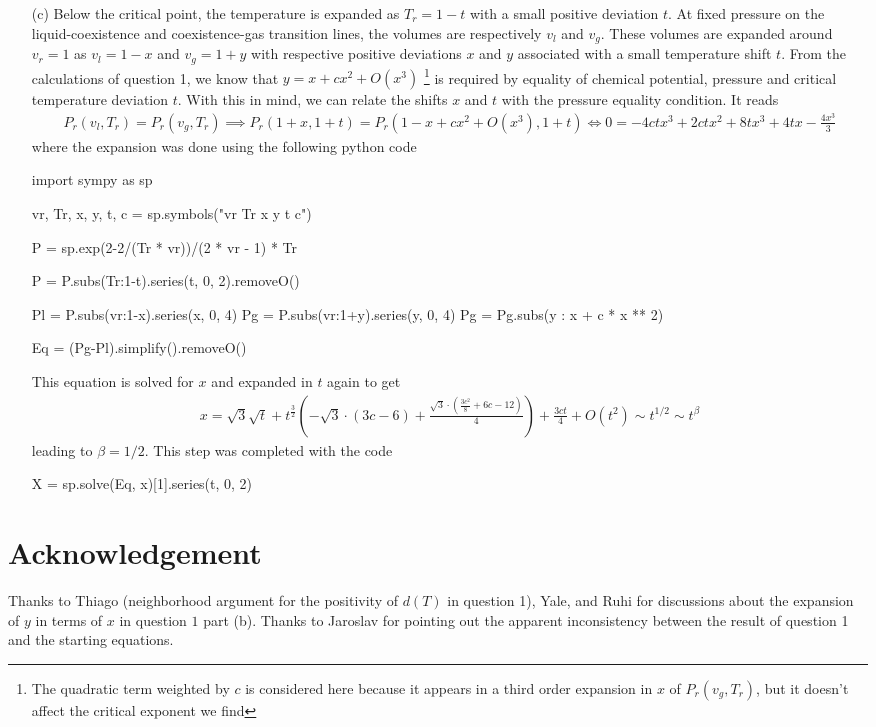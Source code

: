 \documentclass[10pt, a4paper]{article}
\begin{document}
{\begin{enumerate}
  \item[(c)] Below the critical point, the temperature is expanded as $T_r = 1 - t$ with a small positive deviation $t$. At fixed pressure on the liquid-coexistence and coexistence-gas transition lines, the volumes are respectively $v_l$ and $v_g$. These volumes are expanded around $v_r = 1$ as $v_l = 1 - x$ and $v_g = 1 + y$ with respective positive deviations $x$ and $y$ associated with a small temperature shift $t$. From the calculations of question 1, we know that $y = x + c x^2 + O(x^3)$ \footnote{The quadratic term weighted by $c$ is considered here because it appears in a third order expansion in $x$ of $P_r(v_g, T_r)$, but it doesn't affect the critical exponent we find} is required by equality of chemical potential, pressure and critical temperature deviation $t$. With this in mind, we can relate the shifts $x$ and $t$ with the pressure equality condition. It reads  
  \begin{align*}
    P_r(v_l, T_r) = P_r(v_g, T_r) \implies  P_r(1+x, 1+t) = P_r(1-x + cx^2 + O(x^3), 1+t)
    \iff 0 = - 4 c t x^{3} + 2 c t x^{2} + 8 t x^{3} + 4 t x - \frac{4 x^{3}}{3}
  \end{align*} 
where the expansion was done using the following python code
\begin{python}
import sympy as sp 

vr, Tr, x, y, t, c = sp.symbols("vr Tr x y t c")

P = sp.exp(2-2/(Tr * vr))/(2 * vr - 1) * Tr

P = P.subs({Tr:1-t}).series(t, 0, 2).removeO()

Pl = P.subs({vr:1-x}).series(x, 0, 4) 
Pg = P.subs({vr:1+y}).series(y, 0, 4) 
Pg = Pg.subs({y : x + c * x ** 2})

Eq = (Pg-Pl).simplify().removeO()
\end{python}
This equation is solved for $x$ and expanded in $t$ again to get 
\begin{align*}
  x = \sqrt{3} \sqrt{t} + t^{\frac{3}{2}} \left(- \sqrt{3} \cdot \left(3 c - 6\right) + \frac{\sqrt{3} \cdot \left(\frac{3 c^{2}}{8} + 6 c - 12\right)}{4}\right) + \frac{3 c t}{4} + O\left(t^{2}\right) \sim t^{1/2} \sim t^{\beta}
\end{align*}
leading to $\beta = 1/2$. This step was completed with the code 
\begin{python}
  X = sp.solve(Eq, x)[1].series(t, 0, 2)
\end{python}
\end{enumerate}






\section{Acknowledgement}
Thanks to Thiago (neighborhood argument for the positivity of $d(T)$ in question 1), Yale, and Ruhi for discussions about the expansion of $y$ in terms of $x$ in question $1$ part (b). Thanks to Jaroslav for pointing out the apparent inconsistency between the result of question 1 and the starting equations.  
}

\makereferences


\end{document}
